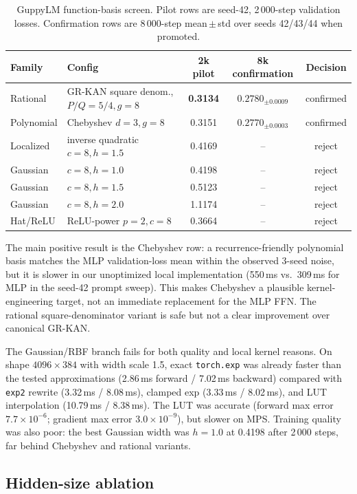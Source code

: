 \documentclass{article}
\newcommand{\grkan}{\textsc{GR-KAN}}
\begin{document}
\begin{table}[h]
\centering
\small
\caption{%
  GuppyLM function-basis screen.
  Pilot rows are seed-42, 2\,000-step validation losses.
  Confirmation rows are 8\,000-step mean\,$\pm$\,std over seeds 42/43/44 when
  promoted.
}
\label{tab:basis_screen}
\begin{tabular}{llccc}
\toprule
Family & Config & 2k pilot & 8k confirmation & Decision \\
\midrule
Rational & \grkan{} square denom., $P/Q=5/4,g=8$ & \textbf{0.3134} & $0.2780_{\pm0.0009}$ & confirmed \\
Polynomial & Chebyshev $d=3,g=8$ & 0.3151 & $\mathbf{0.2770}_{\pm0.0003}$ & confirmed \\
Localized & inverse quadratic $c=8,h=1.5$ & 0.4169 & -- & reject \\
Gaussian & $c=8,h=1.0$ & 0.4198 & -- & reject \\
Gaussian & $c=8,h=1.5$ & 0.5123 & -- & reject \\
Gaussian & $c=8,h=2.0$ & 1.1174 & -- & reject \\
Hat/ReLU & ReLU-power $p=2,c=8$ & 0.3664 & -- & reject \\
\bottomrule
\end{tabular}
\end{table}

The main positive result is the Chebyshev row: a recurrence-friendly polynomial
basis matches the MLP validation-loss mean within the observed 3-seed noise,
but it is slower in our unoptimized local implementation (550\,ms vs.\ 309\,ms
for MLP in the seed-42 prompt sweep).
This makes Chebyshev a plausible kernel-engineering target, not an immediate
replacement for the MLP FFN.
The rational square-denominator variant is safe but not a clear improvement over
canonical \grkan{}.

The Gaussian/RBF branch fails for both quality and local kernel reasons.
On shape $4096\times384$ with width scale 1.5, exact \texttt{torch.exp} was
already faster than the tested approximations (2.86\,ms forward / 7.02\,ms
backward) compared with \texttt{exp2} rewrite (3.32\,ms / 8.08\,ms), clamped
exp (3.33\,ms / 8.02\,ms), and LUT interpolation (10.79\,ms / 8.38\,ms).
The LUT was accurate (forward max error $7.7{\times}10^{-6}$; gradient max
error $3.0{\times}10^{-9}$), but slower on MPS.
Training quality was also poor: the best Gaussian width was $h=1.0$ at 0.4198
after 2\,000 steps, far behind Chebyshev and rational variants.


\subsection{Hidden-size ablation}
\end{document}

